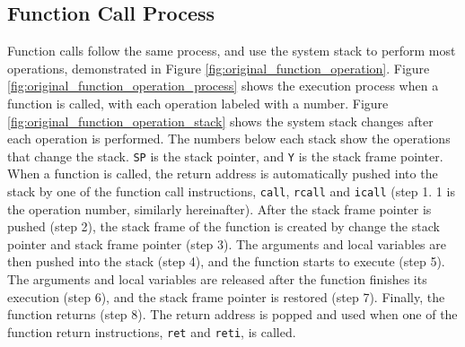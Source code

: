 \subsection{Function Call Process}

Function calls follow the same process, and use the system stack to perform most operations, demonstrated in Figure \ref{fig:original_function_operation}. Figure \ref{fig:original_function_operation_process} shows the execution process when a function is called, with each operation labeled with a number. Figure \ref{fig:original_function_operation_stack} shows the system stack changes after each operation is performed. The numbers below each stack show the operations that change the stack. \texttt{SP} is the stack pointer, and \texttt{Y} is the stack frame pointer. When a function is called, the return address is automatically pushed into the stack by one of the function call instructions, \texttt{call}, \texttt{rcall} and \texttt{icall} (step 1. 1 is the operation number, similarly hereinafter). After the stack frame pointer is pushed (step 2), the stack frame of the function is created by change the stack pointer and stack frame pointer (step 3). The arguments and local variables are then pushed into the stack (step 4), and the function starts to execute (step 5). The arguments and local variables are released after the function finishes its execution (step 6), and the stack frame pointer is restored (step 7). Finally, the function returns (step 8). The return address is popped and used when one of the function return instructions, \texttt{ret} and \texttt{reti}, is called.



